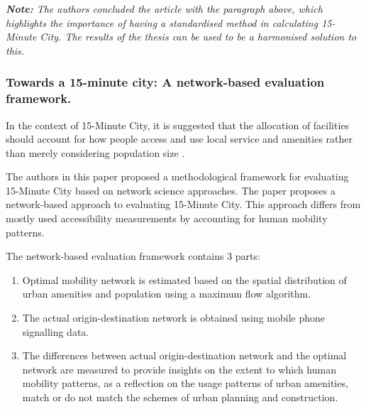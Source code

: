 
\textit{\textbf{Note:} The authors concluded the article with the paragraph above, which highlights the importance of having a standardised method in calculating 15-Minute City. The results of the thesis can be used to be a harmonised solution to this.}

\subsubsection{Towards a 15-minute city: A network-based evaluation framework. \texorpdfstring{\cite{zhang_towards_2023}}{}} \label{zhang_towards_2023}

In the context of 15-Minute City, it is suggested that the allocation of facilities should account for how people access and use local service and amenities rather than merely considering population size \cite{chai_new_2020}.

The authors in this paper proposed a methodological framework for evaluating 15-Minute City based on network science approaches. The paper proposes a network-based approach to evaluating 15-Minute City. This approach differs from mostly used accessibility measurements by accounting for human mobility patterns.

The network-based evaluation framework contains 3 parts:

\begin{enumerate}
    \item Optimal mobility network is estimated based on the spatial distribution of urban amenities and population using a maximum flow algorithm.
    \item The actual origin-destination network is obtained using mobile phone signalling data.
    \item The differences between actual origin-destination network and the optimal network are measured to provide insights on the extent to which human mobility patterns, as a reflection on the usage patterns of urban amenities, match or do not match the schemes of urban planning and construction.
\end{enumerate}


